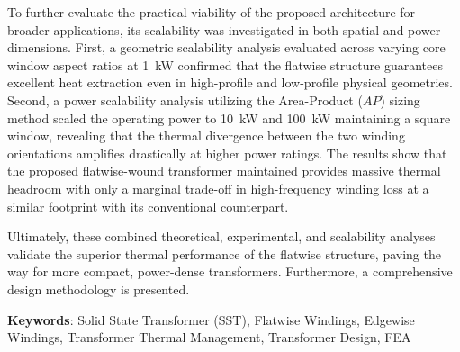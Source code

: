 \par To further evaluate the practical viability of the proposed architecture for broader applications, its scalability was investigated in both spatial and power dimensions. First, a geometric scalability analysis evaluated across varying core window aspect ratios at 1~kW confirmed that the flatwise structure guarantees excellent heat extraction even in high-profile and low-profile physical geometries. Second, a power scalability analysis utilizing the Area-Product ($AP$) sizing method scaled the operating power to 10~kW and 100~kW maintaining a square window, revealing that the thermal divergence between the two winding orientations amplifies drastically at higher power ratings. The results show that the proposed flatwise-wound transformer maintained provides massive thermal headroom with only a marginal trade-off in high-frequency winding loss at a similar footprint with its conventional counterpart.
\par Ultimately, these combined theoretical, experimental, and scalability analyses validate the superior thermal performance of the flatwise structure, paving the way for more compact, power-dense transformers. Furthermore, a comprehensive design methodology is  presented.
\par \textbf{Keywords}: Solid State Transformer (SST), Flatwise Windings, Edgewise Windings, Transformer Thermal Management, Transformer Design, FEA
 
\doublespacing